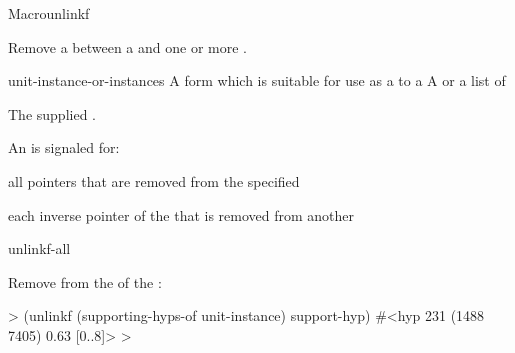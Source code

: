 \documentclass[10pt,twoside,english,pdftex]{article}
\begin{document}

\begin{functiondoc}{Macro}{unlinkf}%
  {
    \returns{} } 
%
%

\fnsyntax

\fnpurpose Remove a  between a  and one
or more .

\fnpackage {}

\fnmodule {}

\fnargs
\begin{args}{unit-instance-or-instances}
 A form which is suitable for use as a
 to a 
 A  or a
list of 
\end{args}

\fnreturns The supplied .

\fnevents
{}%
%
%
%
%
%
An  is signaled for:
\begin{tightitemize}
\item all pointers that are removed from the specified
\item each inverse pointer of the  that is removed from
  another 
\end{tightitemize}

\begin{alsos}{unlinkf-all}
\also[linkf]
\end{alsos}

\fnexample Remove  from the 
 of the  
:
%
\W\supp
\begin{example}
  > (unlinkf (supporting-hyps-of unit-instance) support-hyp)
  #<hyp 231 (1488 7405) 0.63 [0..8]>
  >
\end{example}

\end{functiondoc}

\end{document}
